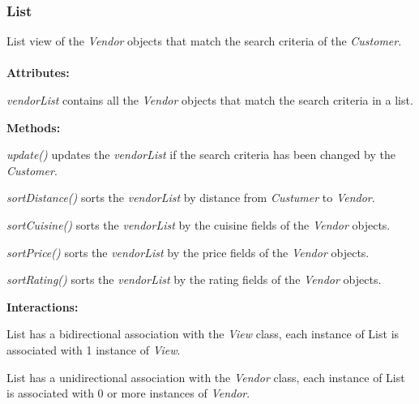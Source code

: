 \subsubsection{List}
List view of the \emph{Vendor} objects that match the search criteria of the \emph{Customer}. \\ \\
\textbf{Attributes:}
\begin{description}
\item\textit{vendorList} contains all the \emph{Vendor} objects that match the search criteria in a list.
\end{description}
\textbf{Methods:}
\begin{description}
\item \textit{update()} updates the \emph{vendorList} if the search criteria has been changed by the \emph{Customer}.
\item \textit{sortDistance()} sorts the \emph{vendorList} by distance from \emph{Custumer} to \emph{Vendor}.
\item \textit{sortCuisine()} sorts the \emph{vendorList} by the cuisine fields of the \emph{Vendor} objects.
\item \textit{sortPrice()} sorts the \emph{vendorList} by the price fields of the \emph{Vendor} objects.
\item \textit{sortRating()} sorts the \emph{vendorList} by the rating fields of the \emph{Vendor} objects.
\end{description}
\textbf{Interactions:}
\begin{description}
\item List has a bidirectional association with the \emph{View} class, each instance of List is associated with 1 instance of \emph{View}.
\item List has a unidirectional association with the \emph{Vendor} class, each instance of List is associated with 0 or more instances of \emph{Vendor}.
\end{description}
\vspace{.2cm}
